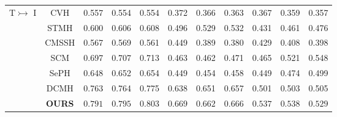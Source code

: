 \documentclass[10pt,twocolumn,letterpaper]{article}
\begin{document}
\begin{table*}[!t]
\begin{center}
\begin{tabular}{|l|c|c|c|c|c|c|c|c|c|c|}
			\hline
			\multirow{7}{*}{T$\rightarrowtail$ I}
			& CVH \cite{Kumar2011Learning} & 0.557 & 0.554 & 0.554 & 0.372 & 0.366 & 0.363 & 0.367 & 0.359 & 0.357\\
			& STMH \cite{Wang2015Semantic}   & 0.600 & 0.606 & 0.608 & 0.496 & 0.529 & 0.532 & 0.431 & 0.461 & 0.476\\
			& CMSSH \cite{Bronstein2010Data} & 0.567 & 0.569 & 0.561 & 0.449 & 0.389 & 0.380 & 0.429 & 0.408 & 0.398\\
			& SCM \cite{Zhang2014Large}      & 0.697 & 0.707 & 0.713 & 0.463 & 0.462 & 0.471 & 0.465 & 0.521 & 0.548\\
			& SePH \cite{Lin2015CVPR}        & 0.648 & 0.652 & 0.654 & 0.449 & 0.454 & 0.458 & 0.449 & 0.474 & 0.499\\
			& DCMH \cite{Jiang2017CVPR}      & 0.763 & 0.764 & 0.775 & 0.638 & 0.651 & 0.657 & 0.501 & 0.503 & 0.505\\
			& \textbf{OURS} & $\mathbf{0.791}$ & $\mathbf{0.795}$ & $\mathbf{0.803}$ & $\mathbf{0.669}$ & $\mathbf{0.662}$ & $\mathbf{0.666}$ & $\mathbf{0.537}$ & $\mathbf{0.538}$ &$\mathbf{0.529}$ \\
			\hline
		\end{tabular}
	\end{center}
	\vspace{-0.55cm}
\end{table*}
\end{document}
